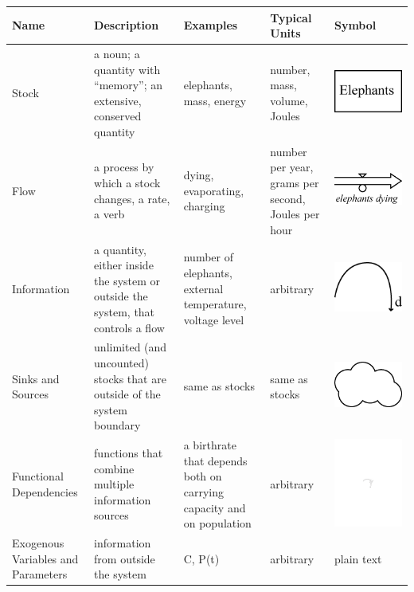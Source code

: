 \begin{center}
\begin{tabular}{ | p{2cm} | p{3cm} | p{3cm} | p{2cm}  | p{3cm}  |}
Name & Description & Examples & Typical Units & Symbol \\
\hline
Stock & a noun; a quantity with ``memory''; an extensive, conserved quantity & elephants, mass, energy & number, mass, volume, Joules & \vspace{0.1in} \includegraphics[height=.5in]{figs/Stock} \\

\hline
Flow & a process by which a stock changes, a rate, a verb & dying, evaporating, charging & number per year, grams per second, Joules per hour & \vspace{0.1in} \includegraphics[height=.4in]{figs/Flow}\\

\hline
Information & a quantity, either inside the system or outside the system, that controls a flow & number of elephants, external temperature, voltage level & arbitrary &  \vspace{0.1in}\includegraphics[height=.5in]{figs/Information}\\

\hline
Sinks and Sources & unlimited (and uncounted) stocks that are outside of the system boundary & same as stocks & same as stocks &  \vspace{0.1in}\includegraphics[height=.5in]{figs/sink} \\

\hline
Functional Dependencies & functions that combine multiple information sources & a birthrate that depends both on carrying capacity and on population & arbitrary &  \vspace{0.1in}\includegraphics[height=.5in]{figs/functionalDependence} \\

\hline
Exogenous Variables and Parameters& information from outside the system & C, P(t) & arbitrary &  plain text \\

\end{tabular}
\end{center}

